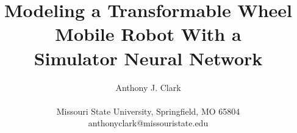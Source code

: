 \documentclass[letterpaper]{article}
\title{Modeling a Transformable Wheel Mobile Robot With a\\Simulator Neural Network}
\author{Anthony J. Clark\\
\mbox{}\\
Missouri State University, Springfield, MO 65804 \\
anthonyclark@missouristate.edu} %
\begin{document}
\maketitle




% 
% 

\footnotesize


\end{document}
